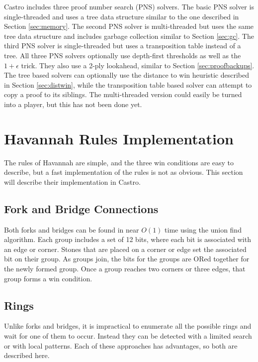 Castro includes three proof number search (PNS) solvers. The basic PNS solver is single-threaded and uses a tree data structure similar to the one described in Section \ref{sec:memory}. The second PNS solver is multi-threaded but uses the same tree data structure and includes garbage collection similar to Section \ref{sec:gc}. The third PNS solver is single-threaded but uses a transposition table instead of a tree. All three PNS solvers optionally use depth-first thresholds\cite{nagai2002dfpn} as well as the $1+\epsilon$ trick\cite{pawlewicz2007epsilon}. They also use a 2-ply lookahead, similar to Section \ref{sec:proofbackups}. The tree based solvers can optionally use the distance to win heuristic described in Section \ref{sec:distwin}, while the transposition table based solver can attempt to copy a proof to its siblings. The multi-threaded version could easily be turned into a player, but this has not been done yet.


\section{Havannah Rules Implementation}\label{sec:impl}

The rules of Havannah are simple, and the three win conditions are easy to describe, but a fast implementation of the rules is not as obvious. This section will describe their implementation in Castro.

\subsection{Fork and Bridge Connections}

Both forks and bridges can be found in near $O(1)$ time using the union find algorithm. Each group includes a set of 12 bits, where each bit is associated with an edge or corner. Stones that are placed on a corner or edge set the associated bit on their group. As groups join, the bits for the groups are ORed together for the newly formed group. Once a group reaches two corners or three edges, that group forms a win condition.

\subsection{Rings}\label{sec:ringimpl}

Unlike forks and bridges, it is impractical to enumerate all the possible rings and wait for one of them to occur. Instead they can be detected with a limited search or with local patterns. Each of these approaches has advantages, so both are described here.

